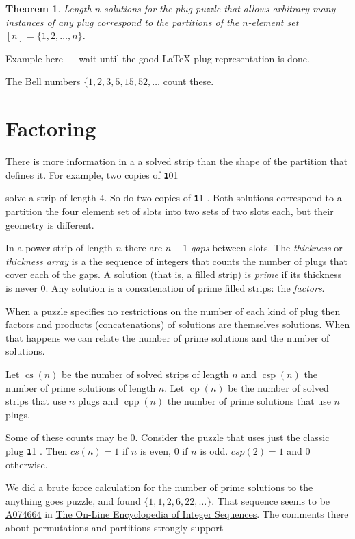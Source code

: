 \documentclass[10pt]{article}
\newtheorem{theorem}{Theorem}
\numberwithin{equation}{section}
\DeclareMathOperator{\cp}{cp} %
\DeclareMathOperator{\cpp}{cpp} %
\DeclareMathOperator{\cs}{cs} %
\DeclareMathOperator{\csp}{csp} %
\newenvironment{anote}
               {{\textcolor{blue}{Note:}}
                 \itshape
               }
               {}
\newcommand{\plug}[1]{%
\mbox{{\textbf\texttt #1}}
}
\begin{document}
\begin{theorem} Length $n$ solutions for the plug
  puzzle that allows arbitrary many instances of any plug
correspond to the partitions of the   $n$-element set $[n] = \{1,2,
\ldots, n \}$. 
\end{theorem}

\begin{anote}
Example here --- wait until the good \LaTeX{} plug representation
  is done.
\end{anote}

The \href{https://en.wikipedia.org/wiki/Bell_number}{Bell numbers}
$\{1, 2, 3, 5, 15, 52, \ldots$  count these.

\section{Factoring}

There is more information in a a solved  strip than the shape of
the partition that defines it. For example, two copies of \plug{101}
solve a strip of length $4$. So do two copies of \plug{11}. Both solutions correspond to a partition the four element set of slots
into two sets of two slots each, but their geometry is different.

In a  power strip of length $n$ there are $n-1$ \emph{gaps} between
slots. The \emph{thickness} or \emph{thickness array} is a the
sequence of integers that counts the number of plugs that cover each
of the gaps. A solution (that is, a filled strip) is \emph{prime} if
its thickness is never $0$. Any solution is a concatenation of prime
filled strips: the \emph{factors}.

When a puzzle specifies no restrictions on the number of each kind of plug then factors and products (concatenations) of solutions are themselves solutions.  When that  happens we can relate the number of prime solutions and the number of solutions.

Let $\cs(n)$ be the number of solved strips of length $n$ and
$\csp(n)$ the number of prime solutions of length $n$. 
Let $\cp(n)$ be the number of solved strips that use $n$ plugs and
$\cpp(n)$ the number of prime solutions that use $n$ plugs.

Some of these counts may be $0$. Consider the
puzzle that uses just the classic  plug \plug{11}.
Then $cs(n) = 1$ if $n$ is even, $0$ if $n$ is odd. $csp(2) =1$ and
$0$  otherwise.

We did a brute force calculation for the number of prime solutions to the anything goes puzzle, and found $\{1,1,2,6,22, \ldots\}$. That sequence seems to be
\href{https://oeis.org/A074664}{A074664} in
\href{https://oeis.org}{The On-Line Encyclopedia of Integer
  Sequences}. The comments there about permutations and partitions
strongly support
\end{document}
